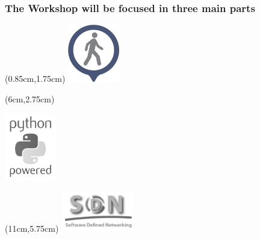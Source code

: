 \documentclass{beamer}
\begin{document}
\begin{frame}
  \frametitle{The Workshop will be focused in three main parts}

  \begin{textblock*}{2.5cm} (0.85cm,1.75cm) %
    \captionsetup{justification=centering}
    \includegraphics[width=2.25cm]{./images/walkthrough.png} %
  \end{textblock*}

  \begin{textblock*}{3cm} (6cm,2.75cm) %
    \begin{center}
    \includegraphics[width=2.25cm]{images/python-gray.png}
    \end{center}
  \end{textblock*}

  \begin{textblock*}{3.2cm} (11cm,5.75cm) %
    \includegraphics[width=3.2cm]{images/sdn-gray.png}
  \end{textblock*}

\end{frame}
\end{document}
